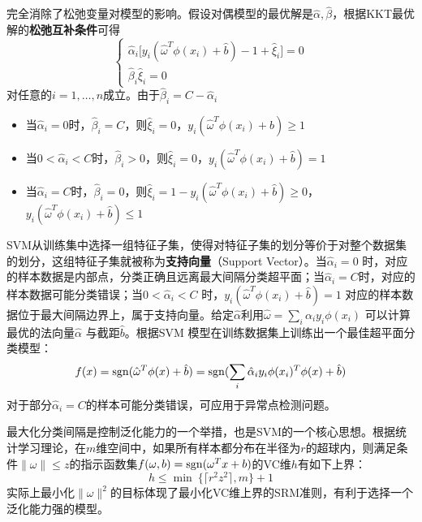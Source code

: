完全消除了松弛变量对模型的影响。假设对偶模型的最优解是$\hat \alpha,\hat \beta$，根据KKT最优解的\textbf{松弛互补条件}可得
\begin{equation}
    \left\{
    \begin{array}{l}
        \hat \alpha_i \big[y_i(\hat \omega^T \phi(x_i) + \hat b) - 1 + \hat \xi_i \big] = 0\\
        \hat \beta_i \hat \xi_i = 0
    \end{array}
    \right.
\end{equation}
对任意的$i = 1,\ldots,n$成立。由于$\hat \beta_i = C - \hat \alpha_i$
\begin{itemize}
  \item 当$\hat \alpha_i = 0$时，$\hat \beta_i = C$，则$\hat \xi_i=0$，$y_i(\hat \omega^T \phi(x_i) + \hat b) \ge 1$
  \item 当$0 < \hat \alpha_i < C$时，$\hat \beta_i>0$，则$\hat \xi_i=0$，$y_i(\hat \omega^T \phi(x_i) + \hat b) = 1$
  \item 当$\hat \alpha_i = C$时，$\hat \beta_i = 0$，则$\hat \xi_i = 1 - y_i(\hat \omega^T \phi(x_i) + \hat b) \ge 0$，$y_i(\hat \omega^T \phi(x_i) + \hat b) \le 1$
\end{itemize}

SVM从训练集中选择一组特征子集，使得对特征子集的划分等价于对整个数据集的划分，这组特征子集就被称为\textbf{支持向量}（Support Vector）。当$\hat \alpha_i=0$ 时，对应的样本数据是内部点，分类正确且远离最大间隔分类超平面；当$\hat \alpha_i=C$时，对应的样本数据可能分类错误；当$0< \hat \alpha_i < C$ 时，$y_i(\hat \omega^T \phi(x_i) + \hat b) = 1$ 对应的样本数据位于最大间隔边界上，属于支持向量。给定$\hat \alpha$利用$\hat \omega=\sum\limits_i \alpha_i y_i \phi(x_i)$ 可以计算最优的法向量$\hat \alpha$ 与截距$\hat b$。根据SVM 模型在训练数据集上训练出一个最佳超平面分类模型：
\begin{equation}\label{eq:hyperplane}
    f(x) = \operatorname{\mathrm{sgn}}(\hat \omega^T \phi(x) + \hat b) = \operatorname{\mathrm{sgn}}(\sum_i \hat \alpha_i y_i \phi(x_i)^T \phi(x) + \hat b)
\end{equation}
对于部分$\hat \alpha_i = C$的样本可能分类错误，可应用于异常点检测问题\cite{matic1992computer}。

最大化分类间隔是控制泛化能力的一个举措，也是SVM的一个核心思想。根据统计学习理论\cite{vapnik1982estimation,vapnik2000nature}，在$m$维空间中，如果所有样本都分布在半径为$r$的超球内，则满足条件$\|\omega\| \le z$的指示函数集$f(\omega, b) = \operatorname{\mathrm{sgn}}(\omega^T x + b)$的VC维$h$有如下上界：
\begin{equation}
    h \le \min~\{\lceil r^2 z^2\rceil, m\} + 1
\end{equation}
实际上最小化$\|\omega\|^2$的目标体现了最小化VC维上界的SRM准则，有利于选择一个泛化能力强的模型。


